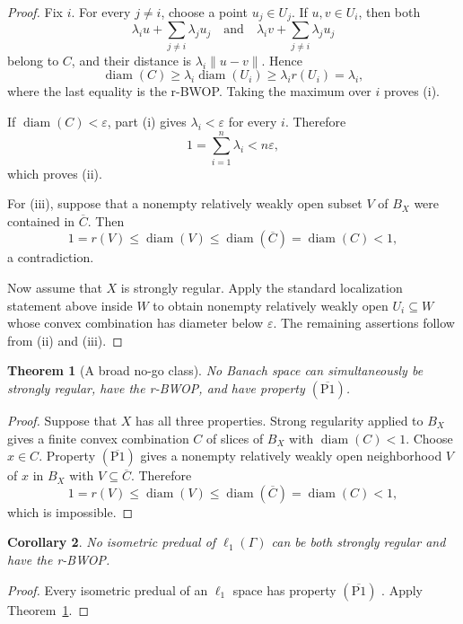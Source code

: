 \documentclass[11pt]{article}
\newtheorem{theorem}{Theorem}
\newtheorem{corollary}[theorem]{Corollary}
\newcommand{\diameter}{\operatorname{diam}}
\newcommand{\Pbar}{(\overline{\mathrm{P1}})}
\begin{document}
\begin{proof}
Fix $i$. For every $j\neq i$, choose a point $u_j\in U_j$. If $u,v\in U_i$,
then both
\[
 \lambda_i u+\sum_{j\neq i}\lambda_j u_j
 \quad\text{and}\quad
 \lambda_i v+\sum_{j\neq i}\lambda_j u_j
\]
belong to $C$, and their distance is $\lambda_i\lVert u-v\rVert$. Hence
\[
 \diameter(C)\geq\lambda_i\diameter(U_i)
 \geq\lambda_i r(U_i)=\lambda_i,
\]
where the last equality is the r-BWOP. Taking the maximum over $i$ proves
\textup{(i)}.

If $\diameter(C)<\varepsilon$, part \textup{(i)} gives
$\lambda_i<\varepsilon$ for every $i$. Therefore
\[
 1=\sum_{i=1}^n\lambda_i<n\varepsilon,
\]
which proves \textup{(ii)}.

For \textup{(iii)}, suppose that a nonempty relatively weakly open subset
$V$ of $B_X$ were contained in $\overline C$. Then
\[
 1=r(V)\leq\diameter(V)\leq\diameter(\overline C)
   =\diameter(C)<1,
\]
a contradiction.

Now assume that $X$ is strongly regular. Apply the standard localization
statement above inside $W$ to obtain nonempty relatively weakly open
$U_i\subseteq W$ whose convex combination has diameter below $\varepsilon$.
The remaining assertions follow from \textup{(ii)} and \textup{(iii)}.
\end{proof}

\begin{theorem}[A broad no-go class]\label{thm:pbar}
No Banach space can simultaneously be strongly regular, have the r-BWOP, and
have property $\Pbar$.
\end{theorem}

\begin{proof}
Suppose that $X$ has all three properties. Strong regularity applied to $B_X$
gives a finite convex combination $C$ of slices of $B_X$ with
$\diameter(C)<1$. Choose $x\in C$. Property $\Pbar$ gives a nonempty
relatively weakly open neighborhood $V$ of $x$ in $B_X$ with
$V\subseteq\overline C$. Therefore
\[
 1=r(V)\leq\diameter(V)\leq\diameter(\overline C)
   =\diameter(C)<1,
\]
which is impossible.
\end{proof}

\begin{corollary}\label{cor:l1}
No isometric predual of $\ell_1(\Gamma)$ can be both strongly regular and
have the r-BWOP.
\end{corollary}

\begin{proof}
Every isometric predual of an $\ell_1$ space has property $\Pbar$
\cite[Corollary 2.8]{BFP}. Apply Theorem~\ref{thm:pbar}.
\end{proof}
\end{document}
